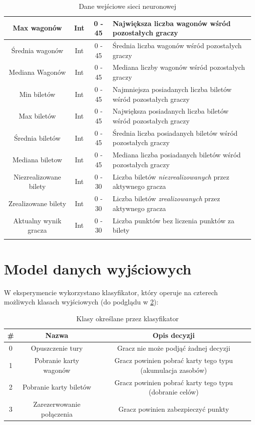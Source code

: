 \documentclass[12pt, oneside]{report}
\begin{document}
\begin{longtable}[h]{| c | c | c | p{6.5cm} |}
		Max wagonów  & Int & 0 - 45 & Największa liczba wagonów wśród pozostałych graczy \\ \hline
		Średnia wagonów  & Int & 0 - 45 & Średnia liczba wagonów wśród pozostałych graczy  \\ \hline
		Mediana Wagonów & Int & 0 - 45 & Mediana liczby wagonów wśród pozostałych graczy  \\ \hline
		Min biletów & Int & 0 - 45 & Najmniejsza posiadanych liczba biletów wśród pozostałych graczy  \\ \hline
		Max biletów & Int & 0 - 45 & Największa posiadanych liczba biletów wśród pozostałych graczy  \\ \hline
		Średnia biletów & Int & 0 - 45 & Średnia liczba posiadanych biletów wśród pozostałych graczy  \\ \hline
		Mediana biletow & Int & 0 - 45 & Mediana liczba posiadanych biletów wśród pozostałych graczy  \\ \hline
		Niezrealizowane bilety & Int & 0 - 30 & Liczba biletów \textit{niezrealizowanych} przez aktywnego gracza \\ \hline
		Zrealizowane bilety & Int & 0 - 30 & Liczba biletów \textit{zrealizowanych} przez aktywnego gracza \\ \hline
		Aktualny wynik gracza & Int & 0 - 30 & Liczba punktów bez liczenia punktów za bilety \\ \hline
		\caption{Dane wejściowe sieci neuronowej}
		\label{table:algo_input}
	\end{longtable}
	
	\section{Model danych wyjściowych}
	W eksperymencie wykorzystano klasyfikator, który operuje na czterech możliwych klasach wyjściowych (do podglądu w \ref{table:algo_classifcator}):
	\begin{table}[h]	
		\begin{center}
			\begin{tabular}{| c | c | c |} \hline
				\# & Nazwa & Opis decyzji \\ \hline
				0 & Opuszczenie tury & Gracz nie może podjąć żadnej decyzji \\ \hline
				1 & Pobranie karty wagonów & Gracz powinien pobrać karty tego typu (akumulacja zasobów) \\ \hline
				2 & Pobranie karty biletów & Gracz powinien pobrać karty tego typu (dobranie celów) \\ \hline
				3 & Zarezerwowanie połączenia & Gracz powinien zabezpieczyć punkty \\ \hline
			\end{tabular}
			\caption{Klasy określane przez klasyfikator}
			\label{table:algo_classifcator}
		\end{center}
	\end{table}
\end{document}
